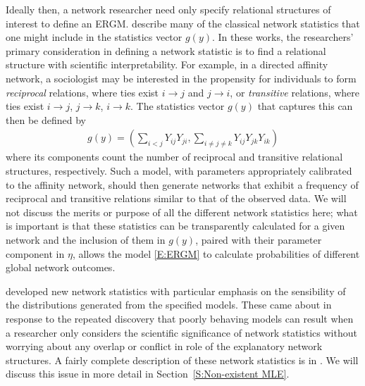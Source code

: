 Ideally then, a network researcher need only specify relational structures of 
interest to define an ERGM.  
\citet*{Wasserman:1996, Pattison:1999, logit, introp*} describe many of 
the classical network statistics that one might include in the statistics vector 
$g(y)$.  In these works, the researchers' primary 
consideration in defining a network statistic is to find a relational structure 
with scientific interpretability.  
For example, in a directed affinity network, a sociologist may be 
interested in the propensity for individuals to form \emph{reciprocal} relations, where 
ties exist $i \to j$ and $j \to i$, or \emph{transitive} relations, where 
ties exist $i \to j$, $j \to k$, $i \to k$.  The statistics vector $g(y)$ 
that captures this can then be defined by
\begin{align*}
	g(y) = \left ( \sum_{i<j} Y_{ij}Y_{ji}, \sum_{i \neq j \neq k} Y_{ij}Y_{jk}Y_{ik} 
			\right )  
\end{align*}
where its components count the number of reciprocal and transitive relational 
structures, respectively.  
Such a model, with parameters appropriately calibrated to the affinity network, 
should then generate networks that exhibit a frequency of reciprocal and 
transitive relations similar to that of the observed data.
We will not discuss the merits or purpose of all the different network statistics 
here; what is important is that these statistics can be transparently calculated for a 
given network and the inclusion of them in $g(y)$, paired with their parameter 
component in $\eta$, allows the model \eqref{E:ERGM} to calculate probabilities of 
different global network outcomes.  


  \citet*{Handcock:2006, Hunter:2006, recentp*} developed new network statistics with 
particular emphasis on the sensibility of the distributions generated from the specified models.  
These came about in response to the repeated discovery that poorly behaving models can
result when a researcher only considers the scientific significance of network
statistics without worrying about any overlap or conflict in role of the 
explanatory network structures.  A fairly 
complete description of these network statistics is in \citet*{Morris:2008}.  
We will discuss this issue in more detail in Section~\ref{S:Non-existent MLE}.

